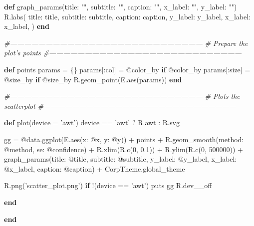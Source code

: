 \documentclass[11pt,]{article}
\newenvironment{Shaded}{\begin{snugshade}}{\end{snugshade}}
\newcommand{\KeywordTok}[1]{\textcolor[rgb]{0.13,0.29,0.53}{\textbf{#1}}}
\newcommand{\DataTypeTok}[1]{\textcolor[rgb]{0.13,0.29,0.53}{#1}}
\newcommand{\DecValTok}[1]{\textcolor[rgb]{0.00,0.00,0.81}{#1}}
\newcommand{\FloatTok}[1]{\textcolor[rgb]{0.00,0.00,0.81}{#1}}
\newcommand{\StringTok}[1]{\textcolor[rgb]{0.31,0.60,0.02}{#1}}
\newcommand{\CommentTok}[1]{\textcolor[rgb]{0.56,0.35,0.01}{\textit{#1}}}
\newcommand{\OtherTok}[1]{\textcolor[rgb]{0.56,0.35,0.01}{#1}}
\newcommand{\NormalTok}[1]{#1}
\begin{document}
\begin{Shaded}
\begin{Highlighting}[]
  \KeywordTok{def}\NormalTok{ graph_params(}\StringTok{title: ""}\NormalTok{, }\StringTok{subtitle: ""}\NormalTok{, }\StringTok{caption: ""}\NormalTok{, }\StringTok{x_label: ""}\NormalTok{, }\StringTok{y_label: ""}\NormalTok{)}
\NormalTok{    R.labs(}
      \StringTok{title: }\NormalTok{title, }
      \StringTok{subtitle: }\NormalTok{subtitle, }
      \StringTok{caption: }\NormalTok{caption,}
      \StringTok{y_label: }\NormalTok{y_label, }
      \StringTok{x_label: }\NormalTok{x_label, }
\NormalTok{    )}
  \KeywordTok{end}

  \CommentTok{#---------------------------------------------------------------------------------}
  \CommentTok{# Prepare the plot's points}
  \CommentTok{#---------------------------------------------------------------------------------}

  \KeywordTok{def}\NormalTok{ points}
\NormalTok{    params = \{\}}
\NormalTok{    params[}\StringTok{:col}\NormalTok{] = }\OtherTok{@color_by} \KeywordTok{if} \OtherTok{@color_by}
\NormalTok{    params[}\StringTok{:size}\NormalTok{] = }\OtherTok{@size_by} \KeywordTok{if} \OtherTok{@size_by}
\NormalTok{    R.geom_point(E.aes(params))}
  \KeywordTok{end}
      
  \CommentTok{#---------------------------------------------------------------------------------}
  \CommentTok{# Plots the scatterplot}
  \CommentTok{#---------------------------------------------------------------------------------}

  \KeywordTok{def}\NormalTok{ plot(device = }\StringTok{'awt'}\NormalTok{)}
\NormalTok{    device == }\StringTok{'awt'}\NormalTok{ ? R.awt : R.svg}
   
\NormalTok{    gg = }\OtherTok{@data}\NormalTok{.ggplot(E.aes(}\StringTok{x: }\OtherTok{@x}\NormalTok{, }\StringTok{y: }\OtherTok{@y}\NormalTok{)) +}
\NormalTok{      points + }
\NormalTok{      R.geom_smooth(}\StringTok{method: }\OtherTok{@method}\NormalTok{, }\StringTok{se: }\OtherTok{@confidence}\NormalTok{) +}
\NormalTok{      R.xlim(R.c(}\DecValTok{0}\NormalTok{, }\FloatTok{0.1}\NormalTok{)) +}
\NormalTok{      R.ylim(R.c(}\DecValTok{0}\NormalTok{, }\DecValTok{500000}\NormalTok{)) + }
\NormalTok{      graph_params(}\StringTok{title: }\OtherTok{@title}\NormalTok{,}
                   \StringTok{subtitle: }\OtherTok{@subtitle}\NormalTok{, }
                   \StringTok{y_label: }\OtherTok{@y_label}\NormalTok{, }
                   \StringTok{x_label: }\OtherTok{@x_label}\NormalTok{, }
                   \StringTok{caption: }\OtherTok{@caption}\NormalTok{) +}
      \DataTypeTok{CorpTheme}\NormalTok{.global_theme}

\NormalTok{    R.png(}\StringTok{'scatter_plot.png'}\NormalTok{) }\KeywordTok{if}\NormalTok{ !(device == }\StringTok{'awt'}\NormalTok{)}
\NormalTok{    puts gg}
\NormalTok{    R.dev__off}
    
  \KeywordTok{end}
  
\KeywordTok{end}
\end{Highlighting}
\end{Shaded}
\end{document}
